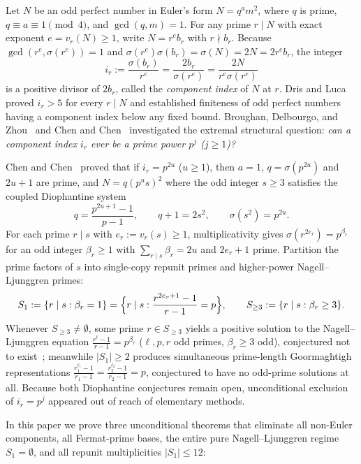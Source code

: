 \documentclass[11pt]{amsart}
\theoremstyle{definition}
\theoremstyle{remark}
\begin{document}
Let $N$ be an odd perfect number in Euler's form $N = q^a m^2$, where $q$ is prime, $q \equiv a \equiv 1 \pmod 4$, and $\gcd(q, m) = 1$. For any prime $r \mid N$ with exact exponent $e = v_r(N) \ge 1$, write $N = r^e b_r$ with $r \nmid b_r$. Because $\gcd(r^e, \sigma(r^e)) = 1$ and $\sigma(r^e)\sigma(b_r) = \sigma(N) = 2N = 2 r^e b_r$, the integer
\[
  i_r := \frac{\sigma(b_r)}{r^e} = \frac{2 b_r}{\sigma(r^e)} = \frac{2N}{r^e \sigma(r^e)}
\]
is a positive divisor of $2 b_r$, called the \emph{component index} of $N$ at $r$. Dris and Luca~\cite{DrisLuca2016} proved $i_r > 5$ for every $r \mid N$ and established finiteness of odd perfect numbers having a component index below any fixed bound. Broughan, Delbourgo, and Zhou~\cite{BDZ2013} and Chen and Chen~\cite{ChenChen2014} investigated the extremal structural question: \emph{can a component index $i_r$ ever be a prime power $p^j$ ($j \ge 1$)?}

Chen and Chen~\cite[Thm.~1.1]{ChenChen2014} proved that if $i_r = p^{2u}$ ($u \ge 1$), then $a = 1$, $q = \sigma(p^{2u})$ and $2u + 1$ are prime, and $N = q(p^u s)^2$ where the odd integer $s \ge 3$ satisfies the coupled Diophantine system
\begin{equation}\label{eq:coupled}
  q = \frac{p^{2u+1} - 1}{p - 1}, \qquad q + 1 = 2 s^2, \qquad \sigma(s^2) = p^{2u}.
\end{equation}
For each prime $r \mid s$ with $e_r := v_r(s) \ge 1$, multiplicativity gives $\sigma(r^{2 e_r}) = p^{\beta_r}$ for an odd integer $\beta_r \ge 1$ with $\sum_{r \mid s} \beta_r = 2u$ and $2 e_r + 1$ prime. Partition the prime factors of $s$ into single-copy repunit primes and higher-power Nagell--Ljunggren primes:
\[
  S_1 := \{r \mid s : \beta_r = 1\} = \Bigl\{r \mid s : \frac{r^{2 e_r + 1} - 1}{r - 1} = p\Bigr\}, \qquad S_{\ge 3} := \{r \mid s : \beta_r \ge 3\}.
\]
Whenever $S_{\ge 3} \ne \emptyset$, some prime $r \in S_{\ge 3}$ yields a positive solution to the Nagell--Ljunggren equation $\frac{r^{\ell} - 1}{r - 1} = p^{\beta_r}$ ($\ell, p, r$ odd primes, $\beta_r \ge 3$ odd), conjectured not to exist~\cite{BennettLevin2015,BugeaudMihailescu2007}; meanwhile $|S_1| \ge 2$ produces simultaneous prime-length Goormaghtigh representations $\frac{r_1^{\ell_1} - 1}{r_1 - 1} = \frac{r_2^{\ell_2} - 1}{r_2 - 1} = p$, conjectured to have no odd-prime solutions at all. Because both Diophantine conjectures remain open, unconditional exclusion of $i_r = p^j$ appeared out of reach of elementary methods.

In this paper we prove three unconditional theorems that eliminate all non-Euler components, all Fermat-prime bases, the entire pure Nagell--Ljunggren regime $S_1 = \emptyset$, and all repunit multiplicities $|S_1| \le 12$:
\end{document}
